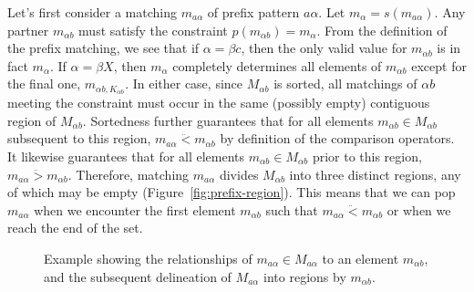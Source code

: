 Let's first consider a matching $m_{a\alpha}$ of prefix
pattern $a\alpha$.  Let $m_\alpha = s(m_{a\alpha})$.
Any partner $m_{\alpha{}b}$ must satisfy the constraint
$p(m_{\alpha{}b}) = m_\alpha$.  From the definition of
the prefix matching, we see that if $\alpha = \beta{}c$,
then the only valid value for $m_{\alpha{}b}$ is in 
fact $m_\alpha$.  If $\alpha = \beta{}X$, then $m_\alpha$
completely determines all elements of $m_{\alpha{}b}$ except
for the final one, $m_{\alpha{}b,K_{\alpha{}b}}$.  In either case,
since $M_{\alpha{}b}$ is sorted, all matchings of $\alpha{}b$
meeting the constraint must occur in the same (possibly empty) 
contiguous region of $M_{\alpha{}b}$.  Sortedness further
guarantees that for all elements $m_{\alpha{}b} \in M_{\alpha{}b}$
subsequent to this region,
$m_{a\alpha} \ddot{<} m_{\alpha{}b}$ by definition of the
comparison operators.  It likewise guarantees that for 
all elements $m_{\alpha{}b} \in M_{\alpha{}b}$ prior to this region,
$m_{a\alpha} \ddot{>} m_{\alpha{}b}$.  Therefore, matching
$m_{a\alpha}$ divides $M_{\alpha{}b}$ into three distinct
regions, any of which may be empty (Figure~\ref{fig:prefix-region}).
This means that we can pop
$m_{a\alpha}$ when we encounter the first element 
$m_{\alpha{}b}$ such that $m_{a\alpha} \ddot{<} m_{\alpha{}b}$
or when we reach the end of the set.

\figpreamble
\begin{figure}
	\figfontsize{
	\begin{center}
		
	\end{center}}
	\figpostamble
	\caption[xample showing the relationships of $m_{a\alpha} \in M_{a\alpha}$
		to an element $m_{\alpha{}b}$.]{Example showing the relationships of $m_{a\alpha} \in M_{a\alpha}$ to an element $m_{\alpha{}b}$, and the subsequent delineation of
		$M_{a\alpha}$ into regions by $m_{\alpha{}b}$.}
	\label{fig:suffix-region}
\end{figure}

